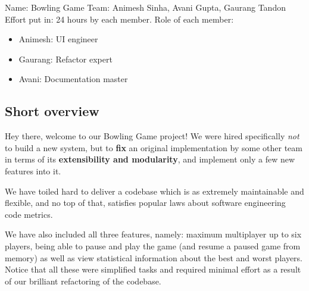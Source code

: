 Name: Bowling Game
Team: Animesh Sinha, Avani Gupta, Gaurang Tandon
Effort put in: 24 hours by each member.
Role of each member:
\begin{itemize}
    \item Animesh: UI engineer
    \item Gaurang: Refactor expert
    \item Avani: Documentation master
\end{itemize}

\subsection{Short overview}

Hey there, welcome to our Bowling Game project! We were hired specifically \textit{not} to build a new system, but to \textbf{fix} an original implementation by some other team in terms of its \textbf{extensibility and modularity}, and implement only a few new features into it.

We have toiled hard to deliver a codebase which is as extremely maintainable and flexible, and no top of that, satisfies popular laws about software engineering code metrics.

We have also included all three features, namely: maximum multiplayer up to six players, being able to pause and play the game (and resume a paused game from memory) as well as view statistical information about the best and worst players. Notice that all these were simplified tasks and required minimal effort as a result of our brilliant refactoring of the codebase.